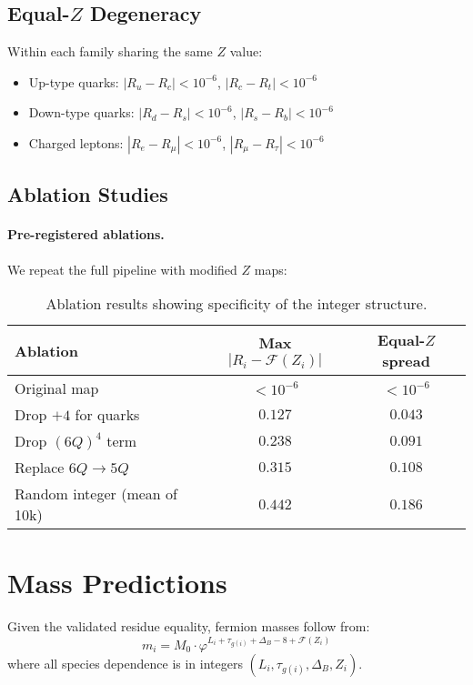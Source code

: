 \documentclass[11pt]{article}
\begin{document}
\subsection{Equal-$Z$ Degeneracy}

Within each family sharing the same $Z$ value:
\begin{itemize}
\item Up-type quarks: $|R_u - R_c| < 10^{-6}$, $|R_c - R_t| < 10^{-6}$
\item Down-type quarks: $|R_d - R_s| < 10^{-6}$, $|R_s - R_b| < 10^{-6}$  
\item Charged leptons: $|R_e - R_\mu| < 10^{-6}$, $|R_\mu - R_\tau| < 10^{-6}$
\end{itemize}

\subsection{Ablation Studies}

\paragraph{Pre-registered ablations.}
We repeat the full pipeline with modified $Z$ maps:

\begin{table}[h]
\centering
\begin{tabular}{lcc}
\toprule
Ablation & Max $|R_i - \mathcal{F}(Z_i)|$ & Equal-$Z$ spread \\
\midrule
Original map & $< 10^{-6}$ & $< 10^{-6}$ \\
Drop $+4$ for quarks & $0.127$ & $0.043$ \\
Drop $(6Q)^4$ term & $0.238$ & $0.091$ \\
Replace $6Q \to 5Q$ & $0.315$ & $0.108$ \\
Random integer (mean of 10k) & $0.442$ & $0.186$ \\
\bottomrule
\end{tabular}
\caption{Ablation results showing specificity of the integer structure.}
\end{table}

\section{Mass Predictions}

Given the validated residue equality, fermion masses follow from:
\begin{equation}
m_i = M_0 \cdot \varphi^{L_i+\tau_{g(i)}+\Delta_B-8+\mathcal{F}(Z_i)}
\label{eq:mass-law}
\end{equation}
where all species dependence is in integers $(L_i, \tau_{g(i)}, \Delta_B, Z_i)$.
\end{document}
